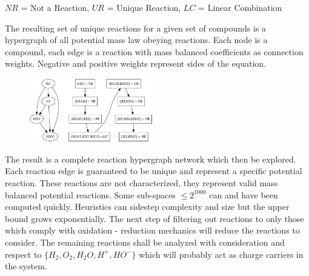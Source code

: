 \documentclass[12pt]{article}
\begin{document}
$NR$ = Not a Reaction, $UR$ = Unique Reaction, $LC$ = Linear Combination

The resulting set of unique reactions for a given set of compounds is a hypergraph of all potential mass law obeying reactions.  Each node is a compound, each edge is a reaction with mass balanced coefficients as connection weights. Negative and positive weights represent sides of the equation.\\
 
 \begin{figure}
  \begin{center}
    \includegraphics[width=0.48\textwidth]{reaction_hypergraph}
  \end{center}
\end{figure}

The result  is a complete reaction hypergraph network which then be explored. Each reaction edge is guaranteed to be unique and represent a specific potential reaction. These reactions are not characterized, they represent valid mass balanced potential reactions. Some sub-spaces $\leq 2^{1000}$ can and have been computed quickly. Heuristics can sidestep complexity and size but the upper bound grows exponentially. The next step of filtering out reactions to only those which comply with oxidation - reduction mechanics will reduce the reactions to consider. The remaining reactions shall be analyzed with consideration and respect to $\{H_2,O_2,H_2O,H^+,HO^-\}$ which will probably act as charge carriers in the system.
\end{document}

